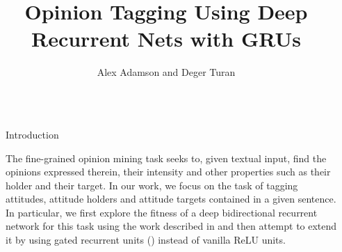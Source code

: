 \documentclass[final]{beamer}
\title{Opinion Tagging Using Deep Recurrent Nets with GRUs} %
\author{Alex Adamson and Deger Turan} %
\institute{Stanford University} %
\newlength{\sepwid}
\newlength{\onecolwid}
\begin{document}
\nocite{*}

\makeatletter
\renewcommand{\overset}[2]{\ensuremath{\mathop{\kern\z@\mbox{#2}}\limits^{\mbox{\scriptsize #1}}}}
\renewcommand{\underset}[2]{\ensuremath{\mathop{\kern\z@\mbox{#2}}\limits_{\mbox{\scriptsize #1}}}}
\makeatother


\setlength{\belowcaptionskip}{1ex} %
\setlength\belowdisplayshortskip{1ex} %

\begin{frame}[t] %

\begin{columns}[t] %

\begin{column}{\sepwid}\end{column} %

\begin{column}{\onecolwid} %


\begin{block}{Introduction}

The fine-grained opinion mining task seeks to, given textual input, find the opinions expressed therein, their intensity and other properties such as their holder and their target. In our work, we focus on the task of tagging attitudes, attitude holders and attitude targets contained in a given sentence. In particular, we first explore the fitness of a deep bidirectional recurrent network for this task using the work described in \cite{irsoy2014opinion} and then attempt to extend it by using gated recurrent units (\cite{DBLP:journals/corr/ChungGCB15}) instead of vanilla ReLU units.

\end{block}



\end{column}
\end{columns}
\end{frame}
\end{document}
